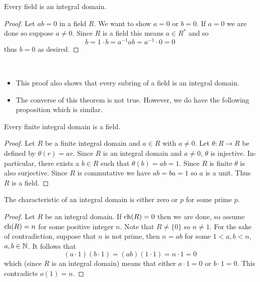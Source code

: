 \documentclass[11pt]{article}
\begin{document}
\begin{proposition}
    Every field is an integral domain.
\end{proposition}

\begin{proof}
    Let $ab=0$ in a field $R$. We want to show $a=0$ or $b=0$. If $a=0$ we are done so suppose $a\neq 0$. Since $R$ is a field this means $a\in R^*$ and so
    \[b=1\cdot b=a^{-1}ab=a^{-1}\cdot0=0\]
    thus $b=0$ as desired.
\end{proof}

\begin{remark}
    \,\begin{itemize}
        \item This proof also shows that every subring of a field is an integral domain.

        \item The converse of this theorem is not true. However, we do have the following proposition which is similar.
    \end{itemize}
\end{remark}

\begin{proposition}
    Every finite integral domain is a field.
\end{proposition}

\begin{proof}
    Let $R$ be a finite integral domain and $a\in R$ with $a\neq0$. Let $\theta:R\to R$ be defined by $\theta(r)=ar$. Since $R$ is an integral domain and $a\neq0$, $\theta$ is injective. In-particular, there exists a $b\in R$ such that $\theta(b)=ab=1$. Since $R$ is finite $\theta$ is also surjective. Since $R$ is commutative we have $ab=ba=1$ so $a$ is a unit. Thus $R$ is a field.
\end{proof}

\begin{proposition}
    The characteristic of an integral domain is either zero or $p$ for some prime $p$.
\end{proposition}

\begin{proof}
    Let $R$ be an integral domain. If $\operatorname{ch}(R)=0$ then we are done, so assume $\operatorname{ch}(R)=n$ for some positive integer $n$. Note that $R\neq\{0\}$ so $n\neq 1$. For the sake of contradiction, suppose that $n$ is not prime, then $n=ab$ for some $1<a,b<n$, $a,b\in \mathbb{N}$. It follows that
    \[(a\cdot1)(b\cdot 1)=(ab)(1\cdot 1)=n\cdot1=0\]
    which (since $R$ is an integral domain) means that either $a\cdot 1=0$ or $b\cdot 1=0$. This contradicts $o(1)=n$.
\end{proof}
\end{document}
